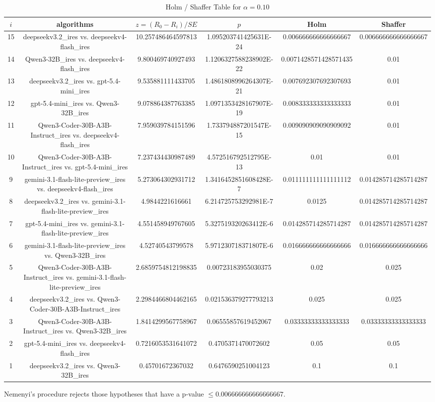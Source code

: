 \documentclass[a4paper,10pt]{article}
\begin{document}
\begin{landscape}
\begin{table}[!htp]
\centering\tiny
\caption{Holm / Shaffer Table for $\alpha=0.10$}
\begin{tabular}{cccccc}
$i$&algorithms&$z=(R_0 - R_i)/SE$&$p$&Holm&Shaffer\\
\hline
15&deepseekv3.2_ires vs. deepseekv4-flash_ires&10.257486464597813&1.095203741425631E-24&0.006666666666666667&0.006666666666666667\\14&Qwen3-32B_ires vs. deepseekv4-flash_ires&9.800469740927493&1.1206327588238902E-22&0.0071428571428571435&0.01\\13&deepseekv3.2_ires vs. gpt-5.4-mini_ires&9.535881111433705&1.4861808996264307E-21&0.007692307692307693&0.01\\12&gpt-5.4-mini_ires vs. Qwen3-32B_ires&9.078864387763385&1.0971353428167907E-19&0.008333333333333333&0.01\\11&Qwen3-Coder-30B-A3B-Instruct_ires vs. deepseekv4-flash_ires&7.959039784151596&1.733794887201547E-15&0.009090909090909092&0.01\\10&Qwen3-Coder-30B-A3B-Instruct_ires vs. gpt-5.4-mini_ires&7.237434430987489&4.572516792512795E-13&0.01&0.01\\9&gemini-3.1-flash-lite-preview_ires vs. deepseekv4-flash_ires&5.273064302931712&1.3416452851608428E-7&0.011111111111111112&0.014285714285714287\\8&deepseekv3.2_ires vs. gemini-3.1-flash-lite-preview_ires&4.9844221616661&6.214725753292981E-7&0.0125&0.014285714285714287\\7&gpt-5.4-mini_ires vs. gemini-3.1-flash-lite-preview_ires&4.551458949767605&5.327519320263412E-6&0.014285714285714287&0.014285714285714287\\6&gemini-3.1-flash-lite-preview_ires vs. Qwen3-32B_ires&4.52740543799578&5.971230718371807E-6&0.016666666666666666&0.016666666666666666\\5&Qwen3-Coder-30B-A3B-Instruct_ires vs. gemini-3.1-flash-lite-preview_ires&2.6859754812198835&0.00723183955030375&0.02&0.025\\4&deepseekv3.2_ires vs. Qwen3-Coder-30B-A3B-Instruct_ires&2.2984466804462165&0.021536379277793213&0.025&0.025\\3&Qwen3-Coder-30B-A3B-Instruct_ires vs. Qwen3-32B_ires&1.8414299567758967&0.06555857619452067&0.03333333333333333&0.03333333333333333\\2&gpt-5.4-mini_ires vs. deepseekv4-flash_ires&0.7216053531641072&0.4705371470072602&0.05&0.05\\1&deepseekv3.2_ires vs. Qwen3-32B_ires&0.45701672367032&0.6476590251004123&0.1&0.1\\\hline
\end{tabular}
\end{table}
Nemenyi's procedure rejects those hypotheses that have a p-value $\le0.006666666666666667$.



\end{landscape}
\end{document}
